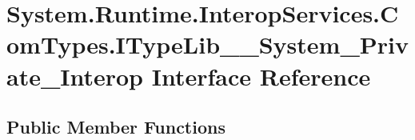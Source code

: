 \hypertarget{interface_system_1_1_runtime_1_1_interop_services_1_1_com_types_1_1_i_type_lib_____system___private___interop}{}\section{System.\+Runtime.\+Interop\+Services.\+Com\+Types.\+I\+Type\+Lib\+\_\+\+\_\+\+System\+\_\+\+Private\+\_\+\+Interop Interface Reference}
\label{interface_system_1_1_runtime_1_1_interop_services_1_1_com_types_1_1_i_type_lib_____system___private___interop}
\subsection*{Public Member Functions}
